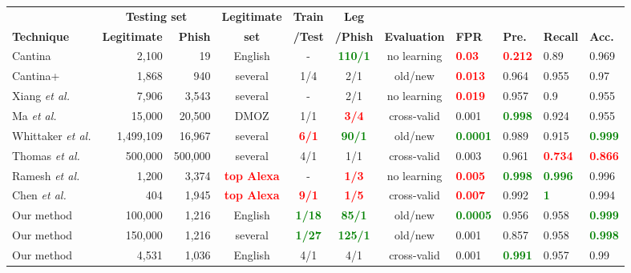 \documentclass[10pt,conference,compsocconf,letterpaper]{IEEEtran}
\begin{document}
\iffeateval
\begin{table*}[tbh]
\centering
\begin{tabular}{l r r c c c c l l l l }
& \multicolumn{2}{c}{\textbf{Testing set}} & \textbf{Legitimate} & \textbf{Train} & \textbf{Leg} & & & & & \\
\textbf{Technique} &  \textbf{Legitimate} & \textbf{Phish} & \textbf{set} & \textbf{/Test} & \textbf{/Phish}  & \textbf{Evaluation}  & \textbf{FPR}  & \textbf{Pre.} & \textbf{Recall} & \textbf{Acc.}\\ \hline
Cantina \cite{zhang:2007:cantina} & 2,100 & 19 & English & - & \textbf{\textcolor{green}{110/1}} & no learning & \textbf{\textcolor{red}{0.03}} & \textbf{\textcolor{red}{0.212}} & 0.89 & 0.969 \\
Cantina+ \cite{xiang:2011:cantina} & 1,868 & 940 & several & 1/4 & 2/1 & old/new & \textbf{\textcolor{red}{0.013}} & 0.964 & 0.955 & 0.97 \\
Xiang \textit{et al.} \cite{Xiang:2009:hybrid} & 7,906 & 3,543 & several & - & 2/1 & no learning & \textbf{\textcolor{red}{0.019}} & 0.957 & 0.9 & 0.955 \\
Ma \textit{et al.} \cite{Ma:2009:beyond} &  15,000 & 20,500 &  DMOZ & 1/1 & \textbf{\textcolor{red}{3/4}} & cross-valid& 0.001 & \textbf{\textcolor{green}{0.998}} & 0.924 & 0.955 \\
Whittaker \textit{et al.} \cite{whittaker:2010:large} &  1,499,109 & 16,967 & several & \textbf{\textcolor{red}{6/1}} & \textbf{\textcolor{green}{90/1}} & old/new & \textbf{\textcolor{green}{0.0001}} & 0.989 & 0.915 & \textbf{\textcolor{green}{0.999}} \\
Thomas \textit{et al.} \cite{thomas:2011:design} & 500,000 & 500,000 & several & 4/1 & 1/1 & cross-valid & 0.003 & 0.961 & \textbf{\textcolor{red}{0.734}} & \textbf{\textcolor{red}{0.866}} \\
Ramesh \textit{et al.} \cite{ramesh:2014:efficious} & 1,200 & 3,374 & \textbf{\textcolor{red}{top Alexa}} & - & \textbf{\textcolor{red}{1/3}} & no learning & \textbf{\textcolor{red}{0.005}} & \textbf{\textcolor{green}{0.998}}  & \textbf{\textcolor{green}{0.996}} & 0.996 \\
Chen \textit{et al.} \cite{Chen:2014:anti} & 404 & 1,945 & \textbf{\textcolor{red}{top Alexa}} & \textbf{\textcolor{red}{9/1}} & \textbf{\textcolor{red}{1/5}} & cross-valid & \textbf{\textcolor{red}{0.007}} & 0.992& \textbf{\textcolor{green}{1}}  & 0.994 \\ \hline
Our method & 100,000 & 1,216 & English & \textbf{\textcolor{green}{1/18}} & \textbf{\textcolor{green}{85/1}} & old/new & \textbf{\textcolor{green}{0.0005}} & 0.956  & 0.958 & \textbf{\textcolor{green}{0.999}} \\
Our method & 150,000 & 1,216 & several & \textbf{\textcolor{green}{1/27}} & \textbf{\textcolor{green}{125/1}} & old/new & 0.001 & 0.857  & 0.958 & \textbf{\textcolor{green}{0.998}} \\
Our method & 4,531 & 1,036 & English & 4/1 & 4/1 & cross-valid& 0.001 & \textbf{\textcolor{green}{0.991}} & 0.957  & 0.99 \\



\end{tabular}
\end{table*}
\end{document}

